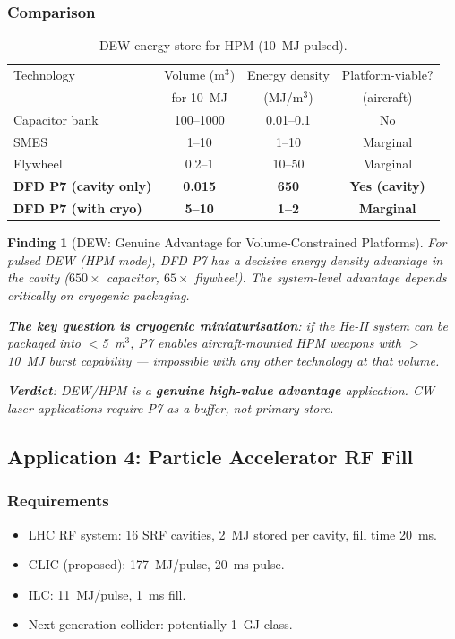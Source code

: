 \documentclass[11pt]{article}
\newtheorem{finding}{Finding}
\begin{document}
\subsubsection{Comparison}

\begin{table}[h]
\centering
\caption{DEW energy store for HPM (10~MJ pulsed).}
\label{tab:DEW}
\begin{tabular}{@{}lccc@{}}
\toprule
Technology & Volume (m$^3$) & Energy density & Platform-viable? \\
 & for 10~MJ & (MJ/m$^3$) & (aircraft) \\
\midrule
Capacitor bank & 100--1000 & 0.01--0.1 & No \\
SMES & 1--10 & 1--10 & Marginal \\
Flywheel & 0.2--1 & 10--50 & Marginal \\
\textbf{DFD P7 (cavity only)} & \textbf{0.015} & \textbf{650} & \textbf{Yes (cavity)} \\
\textbf{DFD P7 (with cryo)} & \textbf{5--10} & \textbf{1--2} & \textbf{Marginal} \\
\bottomrule
\end{tabular}
\end{table}

\begin{finding}[DEW: Genuine Advantage for Volume-Constrained Platforms]
\label{find:DEW}
For pulsed DEW (HPM mode), DFD P7 has a decisive energy density advantage
in the \emph{cavity} ($650\times$ capacitor, $65\times$ flywheel). The
system-level advantage depends critically on cryogenic packaging.

\textbf{The key question is cryogenic miniaturisation}: if the He-II
system can be packaged into $<$5~m$^3$, P7 enables aircraft-mounted HPM
weapons with $>$10~MJ burst capability --- impossible with any other
technology at that volume.

\textbf{Verdict}: DEW/HPM is a \textbf{genuine high-value advantage}
application. CW laser applications require P7 as a buffer, not primary
store.
\end{finding}

\subsection{Application 4: Particle Accelerator RF Fill}

\subsubsection{Requirements}
\begin{itemize}[nosep]
  \item LHC RF system: 16 SRF cavities, 2~MJ stored per cavity,
    fill time 20~ms.
  \item CLIC (proposed): 177~MJ/pulse, 20~ms pulse.
  \item ILC: 11~MJ/pulse, 1~ms fill.
  \item Next-generation collider: potentially 1~GJ-class.
\end{itemize}
\end{document}
